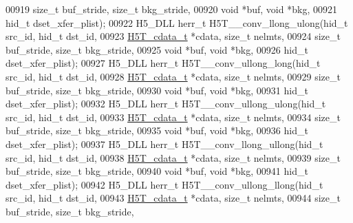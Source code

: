 \begin{DoxyCode}
00919                    \textcolor{keywordtype}{size\_t} buf\_stride, \textcolor{keywordtype}{size\_t} bkg\_stride,
00920                                    \textcolor{keywordtype}{void} *buf, \textcolor{keywordtype}{void} *bkg,
00921                                    hid\_t dset\_xfer\_plist);
00922 H5\_DLL herr\_t H5T\_\_conv\_llong\_ulong(hid\_t src\_id, hid\_t dst\_id,
00923                     \hyperlink{struct_h5_t__cdata__t}{H5T\_cdata\_t} *cdata, \textcolor{keywordtype}{size\_t} nelmts,
00924                     \textcolor{keywordtype}{size\_t} buf\_stride, \textcolor{keywordtype}{size\_t} bkg\_stride,
00925                                     \textcolor{keywordtype}{void} *buf, \textcolor{keywordtype}{void} *bkg,
00926                                     hid\_t dset\_xfer\_plist);
00927 H5\_DLL herr\_t H5T\_\_conv\_ullong\_long(hid\_t src\_id, hid\_t dst\_id,
00928                     \hyperlink{struct_h5_t__cdata__t}{H5T\_cdata\_t} *cdata, \textcolor{keywordtype}{size\_t} nelmts,
00929                     \textcolor{keywordtype}{size\_t} buf\_stride, \textcolor{keywordtype}{size\_t} bkg\_stride,
00930                                     \textcolor{keywordtype}{void} *buf, \textcolor{keywordtype}{void} *bkg,
00931                                     hid\_t dset\_xfer\_plist);
00932 H5\_DLL herr\_t H5T\_\_conv\_ullong\_ulong(hid\_t src\_id, hid\_t dst\_id,
00933                      \hyperlink{struct_h5_t__cdata__t}{H5T\_cdata\_t} *cdata, \textcolor{keywordtype}{size\_t} nelmts,
00934                      \textcolor{keywordtype}{size\_t} buf\_stride, \textcolor{keywordtype}{size\_t} bkg\_stride,
00935                                      \textcolor{keywordtype}{void} *buf, \textcolor{keywordtype}{void} *bkg,
00936                                      hid\_t dset\_xfer\_plist);
00937 H5\_DLL herr\_t H5T\_\_conv\_llong\_ullong(hid\_t src\_id, hid\_t dst\_id,
00938                      \hyperlink{struct_h5_t__cdata__t}{H5T\_cdata\_t} *cdata, \textcolor{keywordtype}{size\_t} nelmts,
00939                      \textcolor{keywordtype}{size\_t} buf\_stride, \textcolor{keywordtype}{size\_t} bkg\_stride,
00940                                      \textcolor{keywordtype}{void} *buf, \textcolor{keywordtype}{void} *bkg,
00941                                      hid\_t dset\_xfer\_plist);
00942 H5\_DLL herr\_t H5T\_\_conv\_ullong\_llong(hid\_t src\_id, hid\_t dst\_id,
00943                      \hyperlink{struct_h5_t__cdata__t}{H5T\_cdata\_t} *cdata, \textcolor{keywordtype}{size\_t} nelmts,
00944                      \textcolor{keywordtype}{size\_t} buf\_stride, \textcolor{keywordtype}{size\_t} bkg\_stride,

\end{DoxyCode}
